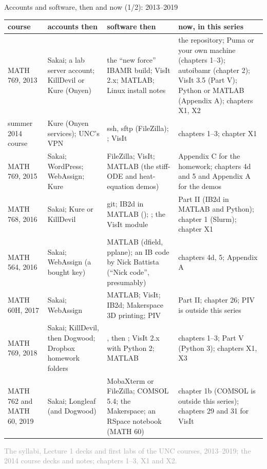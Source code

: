 \documentclass[aspectratio=169,11pt]{beamer}
\newcommand{\sourcecredit}[1]{\vfill\begin{flushright}\tiny\textcolor{DarkGray}{#1}\end{flushright}}
\begin{document}
\begin{frame}{Accounts and software, then and now (1/2): 2013--2019}
\label{fr:accounts1}
\tiny
\renewcommand{\arraystretch}{1.25}
\setlength{\tabcolsep}{3pt}
\begin{tabular}{@{}L{0.14\textwidth}L{0.23\textwidth}L{0.29\textwidth}L{0.28\textwidth}@{}}
\toprule
course & accounts then & software then & now, in this series \\
\midrule
MATH 769, 2013 & Sakai; a lab server account; KillDevil or Kure (Onyen) & the ``new force'' IBAMR build; VisIt 2.x; MATLAB; Linux install notes & the repository; Puma or your own machine (chapters 1--3); autoibamr (chapter 2); VisIt 3.5 (Part V); Python or MATLAB (Appendix A); chapters X1, X2 \\
summer 2014 course & Kure (Onyen services); UNC's VPN & ssh, sftp (FileZilla); ; VisIt & chapters 1--3; chapter X1 \\
MATH 769, 2015 & Sakai; WordPress; WebAssign; Kure & FileZilla; VisIt; MATLAB (the stiff-ODE and heat-equation demos) & Appendix C for the homework; chapters 4d and 5 and Appendix A for the demos \\
MATH 768, 2016 & Sakai; Kure or KillDevil & git; IB2d in MATLAB (); ; the VisIt module & Part II (IB2d in MATLAB and Python); chapter 1 (Slurm); chapter X1 \\
MATH 564, 2016 & Sakai; WebAssign (a bought key) & MATLAB (dfield, pplane); an IB code by Nick Battista (``Nick code'', presumably) & chapters 4d, 5; Appendix A \\
MATH 60H, 2017 & Sakai; WebAssign & MATLAB; VisIt; IB2d; Makerspace 3D printing; PIV & Part II; chapter 26; PIV is outside this series \\
MATH 769, 2018 & Sakai; KillDevil, then Dogwood; Dropbox homework folders & , then ; VisIt 2.x with Python 2; MATLAB & chapters 1--3; Part V (Python 3); chapters X1, X3 \\
MATH 762 and MATH 60, 2019 & Sakai; Longleaf (and Dogwood) & MobaXterm or FileZilla; COMSOL 5.4; the Makerspace; an RSpace notebook (MATH 60) & chapter 1b (COMSOL is outside this series); chapters 29 and 31 for VisIt \\
\bottomrule
\end{tabular}
\sourcecredit{The syllabi, Lecture 1 decks and first labs of the UNC courses, 2013--2019; the 2014 course decks and notes; chapters 1--3, X1 and X2.}
\end{frame}
\end{document}
